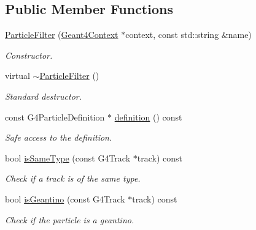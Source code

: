 \subsection*{Public Member Functions}
\begin{DoxyCompactItemize}
\item 
\hyperlink{struct_d_d4hep_1_1_simulation_1_1_particle_filter_a52c16a1189b557c7c2140e370b747043}{ParticleFilter} (\hyperlink{class_d_d4hep_1_1_simulation_1_1_geant4_context}{Geant4Context} $\ast$context, const std::string \&name)
\begin{DoxyCompactList}\small\item\em Constructor. \item\end{DoxyCompactList}\item 
virtual \hyperlink{struct_d_d4hep_1_1_simulation_1_1_particle_filter_a4f4ccdfa224f0a62c411230f7fb0cd65}{$\sim$ParticleFilter} ()
\begin{DoxyCompactList}\small\item\em Standard destructor. \item\end{DoxyCompactList}\item 
const G4ParticleDefinition $\ast$ \hyperlink{struct_d_d4hep_1_1_simulation_1_1_particle_filter_a3e4119fe7dbbca5275c231afa5d2d927}{definition} () const 
\begin{DoxyCompactList}\small\item\em Safe access to the definition. \item\end{DoxyCompactList}\item 
bool \hyperlink{struct_d_d4hep_1_1_simulation_1_1_particle_filter_ae8f08435c7579f91364e51fe5c991b6f}{isSameType} (const G4Track $\ast$track) const 
\begin{DoxyCompactList}\small\item\em Check if a track is of the same type. \item\end{DoxyCompactList}\item 
bool \hyperlink{struct_d_d4hep_1_1_simulation_1_1_particle_filter_a95c653ecd59f614e1a01e6f5a8986927}{isGeantino} (const G4Track $\ast$track) const 
\begin{DoxyCompactList}\small\item\em Check if the particle is a geantino. \item\end{DoxyCompactList}\end{DoxyCompactItemize}
